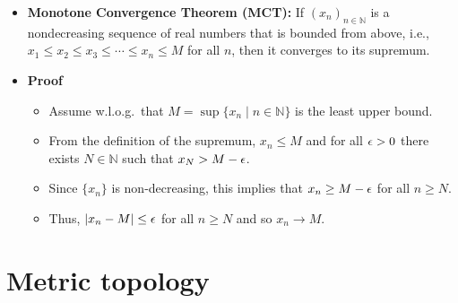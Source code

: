 \documentclass[11pt,twoside]{report}
\newcommand{\bbN}{{\mathbb{N}}}
\begin{document}
\begin{itemize}
\item \textbf{Monotone Convergence Theorem (MCT):} If $(x_n)_{n \in \bbN} $ is a nondecreasing sequence of real numbers that is bounded from above, i.e., $x_1 \le x_2 \le x_3 \le \cdots \le x_n \le M$ for all $n$, then it converges to its supremum. 
 

\item \textbf{Proof} 
\begin{itemize}
\item Assume w.l.o.g.\ that $M = \sup \{x_n \mid n \in \bbN \}$ is the least upper bound.

\item From the definition of the supremum, $x_n \le M$ and for all $\epsilon > 0$ there exists $N \in \bbN$ such that $x_N > M -\epsilon$. 

\item Since $\{x_n\}$ is non-decreasing, this implies that $x_n \ge M -\epsilon$ for all $n \ge N$. 

\item Thus, $|x_n - M| \le \epsilon$ for all $n \ge N$ and so $x_n \to M$. 


\end{itemize}

\end{itemize}




\section{Metric topology} 
\end{document}
